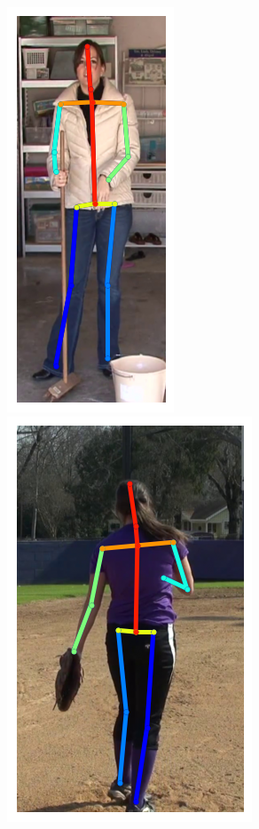 \begin{figure}[t!]
    \centering

    \newcommand{\flowhh}{0.275\columnwidth}
    \includegraphics[height=\flowhh]{resources/Human_Poses/qualitative/img-1}
    \hfill
    \includegraphics[height=\flowhh]{resources/Human_Poses/qualitative/img-2}
    \hfill

\end{figure}
